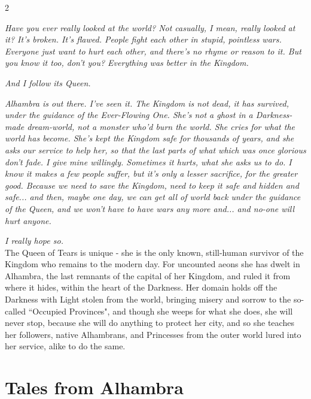 \label{scha:Tears}\begin{multicols}{2}\raggedcolumns

\noindent\textit{Have you ever really looked at the world? Not casually, I mean, really looked at it? It's broken. It's flawed. People fight each other in stupid, pointless wars. Everyone just want to hurt each other, and there's no rhyme or reason to it. But you know it too, don't you? Everything was better in the Kingdom.}

\textit{And I follow its Queen. }

\textit{Alhambra is out there. I've seen it. The Kingdom is not dead, it has survived, under the guidance of the Ever-Flowing One. She's not a ghost in a Darkness-made dream-world, not a monster who'd burn the world. She cries for what the world has become. She's kept the Kingdom safe for thousands of years, and she asks our service to help her, so that the last parts of what which was once glorious don't fade. I give mine willingly. Sometimes it hurts, what she asks us to do. I know it makes a few people suffer, but it's only a lesser sacrifice, for the greater good. Because we need to save the Kingdom, need to keep it safe and hidden and safe... and then, maybe one day, we can get all of world back under the guidance of the Queen, and we won't have to have wars any more and... and no-one will hurt anyone. }

\textit{I really hope so. }\\

\noindent The Queen of Tears is unique - she is the only known, still-human survivor of the Kingdom who remains to the modern day. For uncounted aeons she has dwelt in Alhambra, the last remnants of the capital of her Kingdom, and ruled it from where it hides, within the heart of the Darkness. Her domain holds off the Darkness with Light stolen from the world, bringing misery and sorrow to the so-called \textquotedblleft Occupied Provinces", and though she weeps for what she does, she will never stop, because she will do anything to protect her city, and so she teaches her followers, native Alhambrans, and Princesses from the outer world lured into her service, alike to do the same. 

\section*{Tales from Alhambra}


\end{multicols}
